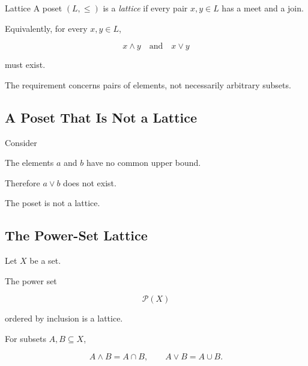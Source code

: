 \begin{definitionbox}{Lattice}
A poset \((L,\leq)\) is a \emph{lattice} if every pair \(x,y\in L\) has a
meet and a join.
\end{definitionbox}

Equivalently, for every \(x,y\in L\),

\[ x\wedge y\quad\text{and}\quad x\vee y \]

must exist.

The requirement concerns pairs of elements, not necessarily arbitrary
subsets.

\subsection{A Poset That Is Not a Lattice}
\label{subsec:poset-not-lattice}

Consider

\begin{center}
\end{center}

The elements \(a\) and \(b\) have no common upper bound.

Therefore \(a\vee b\) does not exist.

The poset is not a lattice.

\subsection{The Power-Set Lattice}
\label{subsec:power-set-lattice}

Let \(X\) be a set.

The power set

\[ \mathcal P(X) \]

ordered by inclusion is a lattice.

For subsets \(A,B\subseteq X\),

\[ A\wedge B=A\cap B, \qquad A\vee B=A\cup B. \]

